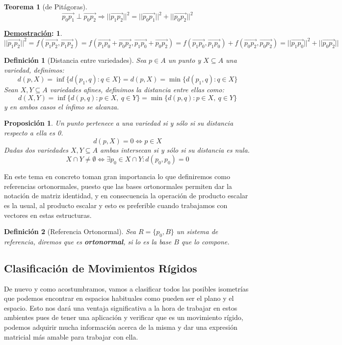 \documentclass[10pt,a4paper,openright]{book}
\theoremstyle{break}
\newtheorem*{defi}{Definición}
\newtheorem*{theo}{Teorema}
\newtheorem*{prop}{Proposición}
\newtheorem*{demo}{\underline{Demostración}:}
\begin{document}
\begin{theo}[de Pitágoras]
$$\vec{p_0p_1}\perp \vec{p_0p_2}\Rightarrow ||\vec{p_1p_2}||^2 = ||\vec{p_0p_1}||^2 + ||\vec{p_0p_2}||^2$$
\end{theo}
\begin{demo}
$$||\vec{p_1p_2}|| ^2 = f(\vec{p_1p_2}, \vec{p_1p_2}) = f(\vec{p_1p_0}+\vec{p_0p_2}, \vec{p_1p_0}+\vec{p_0p_2}) = f (\vec{p_1p_0}, \vec{p_1p_0}) + f(\vec{p_0p_2}, \vec{p_0p_2}) = ||\vec{p_1p_0}||^2 + ||\vec{p_0p_2}||$$
\end{demo}

\begin{defi}[Distancia entre variedades]
Sea $p\in A$ un punto y $X\subseteq A$ una variedad, definimos:
$$d(p,X) = \inf\{d(p_1,q) : q\in X\} = d(p,X) = \min\{d(p_1,q) : q\in X\}$$
Sean $X, Y\subseteq A$ variedades afines, definimos la distancia entre ellas como:
$$d(X,Y) = \inf\{d(p,q) : p\in X, \ q\in Y \}=  \min\{d(p,q) : p\in X, \ q\in Y \}$$
y en ambos casos el ínfimo se alcanza.
\end{defi}

\begin{prop}
Un punto pertenece a una variedad si y sólo si su distancia respecto a ella es 0.
$$d(p,X) = 0 \Leftrightarrow p\in X$$
Dadas dos variedades $X,Y\subseteq A$ ambas intersecan si y sólo si su distancia es nula.
$$X\cap Y \neq \emptyset \Leftrightarrow \exists p_0 \in X \cap Y: d(p_0,p_0) = 0$$
\end{prop}

En este tema en concreto toman gran importancia lo que definiremos como referencias ortonormales, puesto que las bases ortonormales permiten dar la notación de matriz identidad, y en consecuencia la operación de producto escalar es la usual, al producto escalar y esto es preferible cuando trabajamos con vectores en estas estructuras.

\begin{defi}[Referencia Ortonormal]
Sea $R = \{p_0, B\}$ un sistema de referencia, diremos que es \textbf{ortonormal}, si lo es la base $B$ que lo compone.
\end{defi}

\subsection{Clasificación de Movimientos Rígidos}
De nuevo y como acostumbramos, vamos a clasificar todos las posibles isometrías que podemos encontrar en espacios habituales como pueden ser el plano y el espacio. Esto nos dará una ventaja significativa a la hora de trabajar en estos ambientes pues de tener una aplicación y verificar que es un movimiento rígido, podemos adquirir mucha información acerca de la misma y dar una expresión matricial más amable para trabajar con ella.
\end{document}
